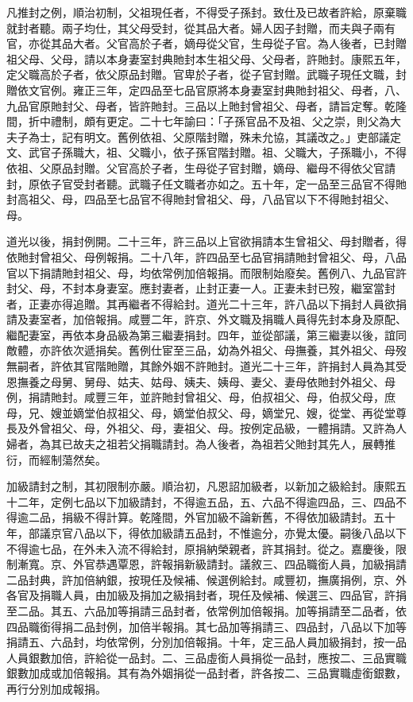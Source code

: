 \begin{pinyinscope}
凡推封之例，順治初制，父祖現任者，不得受子孫封。致仕及已故者許給，原棄職就封者聽。兩子均仕，其父母受封，從其品大者。婦人因子封贈，而夫與子兩有官，亦從其品大者。父官高於子者，嫡母從父官，生母從子官。為人後者，已封贈祖父母、父母，請以本身妻室封典貤封本生祖父母、父母者，許貤封。康熙五年，定父職高於子者，依父原品封贈。官卑於子者，從子官封贈。武職子現任文職，封贈依文官例。雍正三年，定四品至七品官原將本身妻室封典貤封祖父、母者，八、九品官原貤封父、母者，皆許貤封。三品以上貤封曾祖父、母者，請旨定奪。乾隆間，折中禮制，頗有更定。二十七年諭曰：「子孫官品不及祖、父之崇，則父為大夫子為士，記有明文。舊例依祖、父原階封贈，殊未允協，其議改之。」吏部議定文、武官子孫職大，祖、父職小，依子孫官階封贈。祖、父職大，子孫職小，不得依祖、父原品封贈。父官高於子者，生母從子官封贈，嫡母、繼母不得依父官請封，原依子官受封者聽。武職子任文職者亦如之。五十年，定一品至三品官不得貤封高祖父、母，四品至七品官不得貤封曾祖父、母，八品官以下不得貤封祖父、母。

道光以後，捐封例開。二十三年，許三品以上官欲捐請本生曾祖父、母封贈者，得依貤封曾祖父、母例報捐。二十八年，許四品至七品官捐請貤封曾祖父、母，八品官以下捐請貤封祖父、母，均依常例加倍報捐。而限制始廢矣。舊例八、九品官許封父、母，不封本身妻室。應封妻者，止封正妻一人。正妻未封已歿，繼室當封者，正妻亦得追贈。其再繼者不得給封。道光二十三年，許八品以下捐封人員欲捐請及妻室者，加倍報捐。咸豐二年，許京、外文職及捐職人員得先封本身及原配、繼配妻室，再依本身品級為第三繼妻捐封。四年，並從部議，第三繼妻以後，誼同敵體，亦許依次遞捐矣。舊例仕宦至三品，幼為外祖父、母撫養，其外祖父、母歿無嗣者，許依其官階貤贈，其餘外姻不許貤封。道光二十三年，許捐封人員為其受恩撫養之母舅、舅母、姑夫、姑母、姨夫、姨母、妻父、妻母依貤封外祖父、母例，捐請貤封。咸豐三年，並許貤封曾祖父、母，伯叔祖父、母，伯叔父母，庶母，兄、嫂並嫡堂伯叔祖父、母，嫡堂伯叔父、母，嫡堂兄、嫂，從堂、再從堂尊長及外曾祖父、母，外祖父、母，妻祖父、母。按例定品級，一體捐請。又許為人婦者，為其已故夫之祖若父捐職請封。為人後者，為祖若父貤封其先人，展轉推衍，而經制蕩然矣。

加級請封之制，其初限制亦嚴。順治初，凡恩詔加級者，以新加之級給封。康熙五十二年，定例七品以下加級請封，不得逾五品，五、六品不得逾四品，三、四品不得逾二品，捐級不得計算。乾隆間，外官加級不論新舊，不得依加級請封。五十年，部議京官八品以下，得依加級請五品封，不惟逾分，亦覺太優。嗣後八品以下不得逾七品，在外未入流不得給封，原捐納榮親者，許其捐封。從之。嘉慶後，限制漸寬。京、外官恭遇覃恩，許報捐新級請封。議敘三、四品職銜人員，加級捐請二品封典，許加倍納銀，按現任及候補、候選例給封。咸豐初，撫廣捐例，京、外各官及捐職人員，由加級及捐加之級捐封者，現任及候補、候選三、四品官，許捐至二品。其五、六品加等捐請三品封者，依常例加倍報捐。加等捐請至二品者，依四品職銜得捐二品封例，加倍半報捐。其七品加等捐請三、四品封，八品以下加等捐請五、六品封，均依常例，分別加倍報捐。十年，定三品人員加級捐封，按一品人員銀數加倍，許給從一品封。二、三品虛銜人員捐從一品封，應按二、三品實職銀數加成或加倍報捐。其有為外姻捐從一品封者，許各按二、三品實職虛銜銀數，再行分別加成報捐。


\end{pinyinscope}
